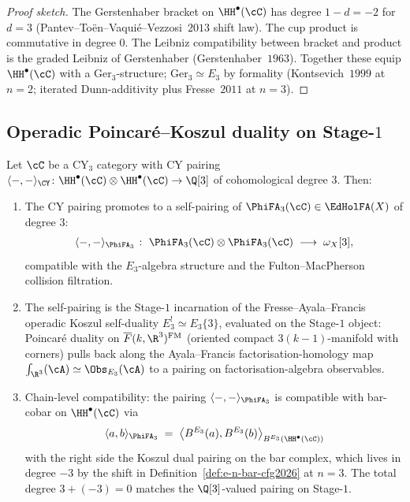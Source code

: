 \begin{proof}[Proof sketch]
The Gerstenhaber bracket on $\HH^\bullet(\cC)$ has degree $1 - d = -2$
for $d = 3$ (Pantev--To\"en--Vaqui\'e--Vezzosi~$2013$ shift law). The
cup product is commutative in degree $0$. The Leibniz compatibility
between bracket and product is the graded Leibniz of Gerstenhaber
(Gerstenhaber~$1963$). Together these equip $\HH^\bullet(\cC)$ with a
$\mathrm{Ger}_3$-structure; $\mathrm{Ger}_3 \simeq E_3$ by formality
(Kontsevich~$1999$ at $n = 2$; iterated Dunn-additivity plus
Fresse~$2011$ at $n = 3$).
\end{proof}

\subsection*{Operadic Poincar\'e--Koszul duality on Stage-$1$}

\begin{theorem}
\label{thm:stage-1-self-pairing-cfg2026}
\ClaimStatusProvedHere
Let $\cC$ be a CY$_3$ category with CY pairing
$\langle -, - \rangle_{\CY} \colon \HH^\bullet(\cC) \otimes \HH^\bullet(\cC) \to \Q[3]$
of cohomological degree $3$. Then:
\begin{enumerate}[label=\textup{(\roman*)}]
  \item The CY pairing promotes to a self-pairing of
        $\PhiFA_3(\cC) \in \EdHolFA(X)$ of degree $3$:
        \[
          \langle -, - \rangle_{\PhiFA_3}
          \;\colon\;
          \PhiFA_3(\cC) \otimes \PhiFA_3(\cC)
          \;\longrightarrow\;
          \omega_X[3],
        \]
        compatible with the $E_3$-algebra structure and the
        Fulton--MacPherson collision filtration.
  \item The self-pairing is the Stage-$1$ incarnation of the
        Fresse--Ayala--Francis operadic Koszul self-duality
        $E_3^! \simeq E_3\{3\}$, evaluated on the Stage-$1$ object:
        Poincar\'e duality on
        $\overline{F}(k, \R^3)^{\mathrm{FM}}$ (oriented compact
        $3(k-1)$-manifold with corners) pulls back along the
        Ayala--Francis factorisation-homology map
        $\int_{\R^3}(\cA) \simeq \Obs_{E_3}(\cA)$ to a pairing on
        factorisation-algebra observables.
  \item Chain-level compatibility: the pairing
        $\langle -, - \rangle_{\PhiFA_3}$ is compatible with bar-cobar on
        $\HH^\bullet(\cC)$ via
        \[
          \langle a, b \rangle_{\PhiFA_3}
          \;=\; \bigl\langle B^{E_3}(a), B^{E_3}(b) \bigr\rangle_{B^{E_3}(\HH^\bullet(\cC))}
        \]
        with the right side the Koszul dual pairing on the bar complex,
        which lives in degree $-3$ by the shift in
        Definition~\textup{\ref{def:e-n-bar-cfg2026}} at $n = 3$. The
        total degree $3 + (-3) = 0$ matches the $\Q[3]$-valued pairing
        on Stage-$1$.
\end{enumerate}
\end{theorem}

